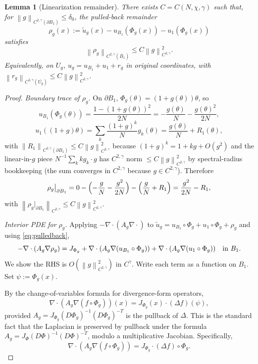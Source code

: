 \documentclass[11pt]{article}
\newtheorem{lemma}[theorem]{Lemma}
\theoremstyle{definition}
\newcommand{\norm}[1]{\left\|#1\right\|}
\begin{document}
\begin{lemma}[Linearization remainder]\label{lem:lin}
There exists $C=C(N,\chi,\gamma)$ such that, for
$\norm{g}_{C^{2,\gamma}(\partial B_1)}\le\delta_0$, the pulled-back remainder
\[
\rho_g(x):=\widetilde u_g(x)-u_{B_1}(\Phi_g(x))-u_1(\Phi_g(x))
\]
satisfies
\[
\norm{\rho_g}_{C^{2,\gamma}(\overline{B_1})}
\le
C\norm{g}_{C^{2,\gamma}}^2.
\]
Equivalently, on $U_g$, $u_g=u_{B_1}+u_1+r_g$ in original coordinates, with
$\norm{r_g}_{C^{2,\gamma}(\overline{U_g})}\le C\norm{g}_{C^{2,\gamma}}^2$.
\end{lemma}

\begin{proof}
\emph{Boundary trace of $\rho_g$.} On $\partial B_1$,
$\Phi_g(\theta)=(1+g(\theta))\theta$, so
\[
u_{B_1}(\Phi_g(\theta))=\frac{1-(1+g(\theta))^2}{2N}
=-\frac{g(\theta)}{N}-\frac{g(\theta)^2}{2N},
\]
\[
u_1((1+g)\theta)=\sum_k\frac{(1+g)^k}{N}g_k(\theta)
=\frac{g(\theta)}{N}+R_1(\theta),
\]
with $\norm{R_1}_{C^{2,\gamma}(\partial B_1)}\le C\norm{g}_{C^{2,\gamma}}^2$
because $(1+g)^k=1+kg+O(g^2)$ and the linear-in-$g$ piece
$N^{-1}\sum_k kg_k\cdot g$ has $C^{2,\gamma}$ norm $\le
C\norm{g}_{C^{2,\gamma}}^2$ by spectral-radius bookkeeping (the sum
converges in $C^{2,\gamma}$ because $g\in C^{2,\gamma}$). Therefore
\[
\rho_g\big|_{\partial B_1}
=0
-\Bigl(-\frac{g}{N}-\frac{g^2}{2N}\Bigr)
-\Bigl(\frac{g}{N}+R_1\Bigr)
=\frac{g^2}{2N}-R_1,
\]
with $\norm{\rho_g\big|_{\partial B_1}}_{C^{2,\gamma}}\le C\norm{g}_{C^{2,\gamma}}^2$.

\emph{Interior PDE for $\rho_g$.} Applying $-\nabla\cdot(A_g\nabla\cdot)$ to
$\widetilde u_g=u_{B_1}\circ\Phi_g+u_1\circ\Phi_g+\rho_g$ and using
\eqref{eq:pulledback},
\begin{equation}\label{eq:rho-pde}
-\nabla\cdot(A_g\nabla\rho_g)
=
J_{\Phi_g}
+\nabla\cdot(A_g\nabla(u_{B_1}\circ\Phi_g))
+\nabla\cdot(A_g\nabla(u_1\circ\Phi_g))
\quad\hbox{in }B_1.
\end{equation}
We show the RHS is $O(\norm{g}_{C^{2,\gamma}}^2)$ in $C^\gamma$. Write each
term as a function on $B_1$. Set $\psi:=\Phi_g(x)$.

By the change-of-variables formula for divergence-form operators,
\[
\nabla\cdot(A_g\nabla(f\circ\Phi_g))(x)
=
J_{\Phi_g}(x)\cdot(\Delta f)(\psi),
\]
provided $A_g=J_{\Phi_g}(D\Phi_g)^{-1}(D\Phi_g)^{-T}$ is the pullback of
$\Delta$. This is the standard fact that the Laplacian is preserved by
pullback under the formula $A_g=J_\Phi (D\Phi)^{-1}(D\Phi)^{-T}$, modulo a
multiplicative Jacobian. Specifically,
\begin{equation}\label{eq:divpull}
\nabla\cdot(A_g\nabla(f\circ\Phi_g))=J_{\Phi_g}\cdot(\Delta f)\circ\Phi_g.
\end{equation}


\end{proof}
\end{document}
